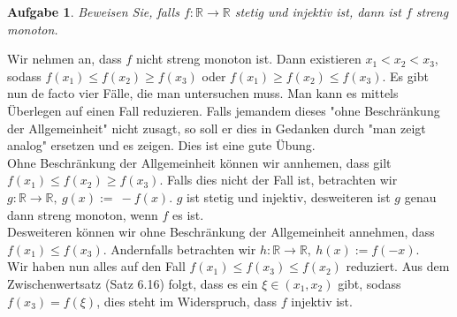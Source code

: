 \documentclass[a4paper, 20]{exam}
\newtheorem{ex}{Aufgabe}
\newcommand\RR{\mathbb{R}}
\begin{document}
\begin{ex}
Beweisen Sie, falls $f:\RR \longrightarrow \RR$ stetig und injektiv ist, dann ist $f$ streng monoton.
\end{ex}
\begin{solution}
Wir nehmen an, dass $f$ nicht streng monoton ist. Dann existieren $x_1 < x_2 < x_3$, sodass $f(x_1) \leq f(x_2) \geq f(x_3)$ oder $f(x_1)\geq f(x_2) \leq f(x_3)$. Es gibt nun de facto vier F\"alle, die man untersuchen muss. Man kann es mittels \"Uberlegen auf einen Fall reduzieren. Falls jemandem dieses "ohne Beschr\"ankung der Allgemeinheit" nicht zusagt, so soll er dies in Gedanken durch "man zeigt analog" ersetzen und es zeigen. Dies ist eine gute \"Ubung.\\
Ohne Beschr\"ankung der Allgemeinheit k\"onnen wir annhemen, dass gilt $f(x_1) \leq f(x_2) \geq f(x_3)$. Falls dies nicht der Fall ist, betrachten wir $g: \RR \longrightarrow \RR,~ g(x):=\ -f(x)$. $g$ ist stetig und injektiv, desweiteren ist $g$ genau dann streng monoton, wenn $f$ es ist.\\
Desweiteren k\"onnen wir ohne Beschr\"ankung der Allgemeinheit annehmen, dass $f(x_1) \leq f(x_3)$. Andernfalls betrachten wir $h: \RR \longrightarrow \RR,\ h(x):=f(-x)$.\\
Wir haben nun alles auf den Fall $f(x_1)\leq f(x_3) \leq f(x_2)$ reduziert. Aus dem Zwischenwertsatz (Satz 6.16) folgt, dass es ein $\xi \in (x_1, x_2)$ gibt, sodass $f(x_3)= f(\xi)$, dies steht im Widerspruch, dass $f$ injektiv ist.
\end{solution} 
\end{document}
